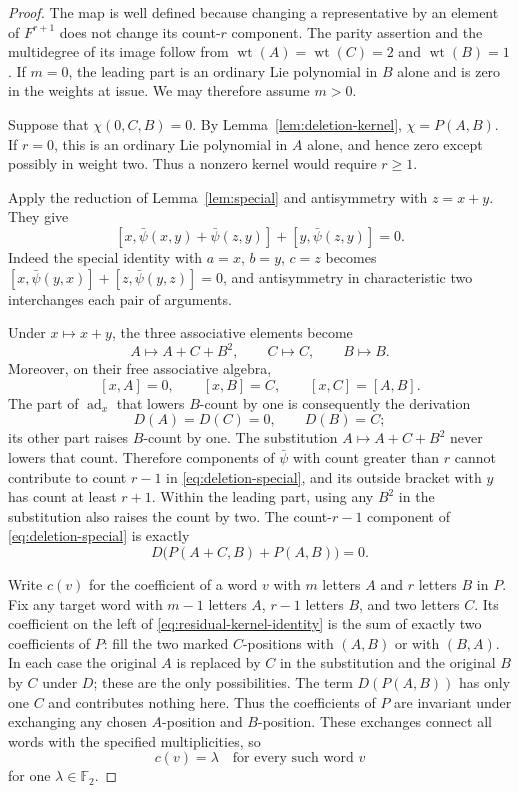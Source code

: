 \documentclass[11pt]{article}
\theoremstyle{definition}
\theoremstyle{remark}
\numberwithin{equation}{section}
\begin{document}
\begin{proof}
The map is well defined because changing a representative by an
element of $F^{r+1}$ does not change its count-$r$ component.  The
parity assertion and the multidegree of its image follow from
$\operatorname{wt}(A)=\operatorname{wt}(C)=2$ and $\operatorname{wt}(B)=1$.  If $m=0$, the leading part is an ordinary Lie polynomial
in $B$ alone and is zero in the weights at issue.  We may therefore
assume $m>0$.

Suppose that $\chi(0,C,B)=0$.  By Lemma~\ref{lem:deletion-kernel},
$\chi=P(A,B)$.  If $r=0$, this is an ordinary Lie polynomial in $A$
alone, and hence zero except possibly in weight two.  Thus a nonzero
kernel would require $r\geq1$.

Apply the reduction of Lemma~\ref{lem:special} and antisymmetry with
$z=x+y$.  They give
\begin{equation}\label{eq:deletion-special}
 [x,\bar\psi(x,y)+\bar\psi(z,y)]+[y,\bar\psi(z,y)]=0.
\end{equation}
Indeed the special identity with $a=x$, $b=y$, $c=z$ becomes
$[x,\bar\psi(y,x)]+[z,\bar\psi(y,z)]=0$, and antisymmetry in
characteristic two interchanges each pair of arguments.

Under $x\mapsto x+y$, the three associative elements become
\[
 A\mapsto A+C+B^2,\qquad C\mapsto C,\qquad B\mapsto B.
\]
Moreover, on their free associative algebra,
\[
 [x,A]=0,\qquad [x,B]=C,\qquad [x,C]=[A,B].
\]
The part of $\operatorname{ad}_x$ that lowers $B$-count by one is consequently the
derivation
\[
 D(A)=D(C)=0,\qquad D(B)=C;
\]
its other part raises $B$-count by one.  The substitution
$A\mapsto A+C+B^2$ never lowers that count.  Therefore components of
$\bar\psi$ with count greater than $r$ cannot contribute to count
$r-1$ in \eqref{eq:deletion-special}, and its outside bracket with $y$
has count at least $r+1$.  Within the leading part, using any $B^2$
in the substitution also raises the count by two.  The count-$r-1$
component of \eqref{eq:deletion-special} is exactly
\begin{equation}\label{eq:residual-kernel-identity}
 D\bigl(P(A+C,B)+P(A,B)\bigr)=0.
\end{equation}

Write $c(v)$ for the coefficient of a word $v$ with $m$ letters $A$
and $r$ letters $B$ in $P$.  Fix any target word with $m-1$ letters
$A$, $r-1$ letters $B$, and two letters $C$.  Its coefficient on the
left of \eqref{eq:residual-kernel-identity} is the sum of exactly two
coefficients of $P$: fill the two marked $C$-positions with $(A,B)$
or with $(B,A)$.  In each case the original $A$ is replaced by $C$
in the substitution and the original $B$ by $C$ under $D$; these are
the only possibilities.  The term $D(P(A,B))$ has only one $C$ and
contributes nothing here.  Thus the coefficients of $P$ are invariant
under exchanging any chosen $A$-position and $B$-position.  These
exchanges connect all words with the specified multiplicities, so
\begin{equation}\label{eq:constant-residual-coefficients}
 c(v)=\lambda\quad\text{for every such word }v
\end{equation}
for one $\lambda\in{\mathbb F_2}$.


\end{proof}
\end{document}
